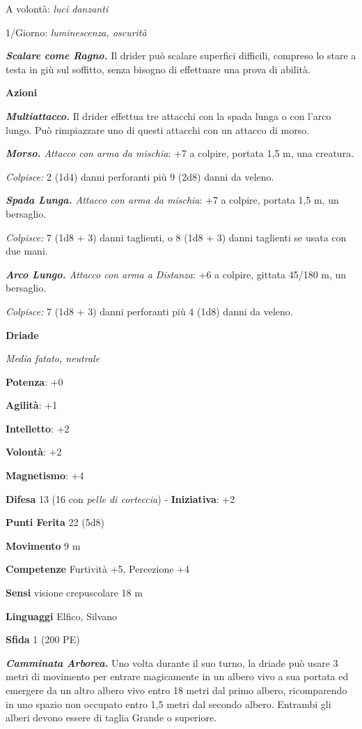 \begin{multicols}{2}
A volontà: \emph{luci danzanti}

1/Giorno: \emph{luminescenza, oscurità}

\emph{\textbf{Scalare come Ragno.}} Il drider può scalare superfici
difficili, compreso lo stare a testa in giù sul soffitto, senza bisogno
di effettuare una prova di abilità.

\textbf{Azioni}

\emph{\textbf{Multiattacco.}} Il drider effettua tre attacchi con la
spada lunga o con l'arco lungo. Può rimpiazzare uno di questi attacchi
con un attacco di morso.

\emph{\textbf{Morso.} Attacco con arma da mischia}: +7 a colpire,
portata 1,5 m, una creatura.

\emph{Colpisce:} 2 (1d4) danni perforanti più 9 (2d8) danni da veleno.

\emph{\textbf{Spada Lunga.} Attacco con arma da mischia}: +7 a colpire,
portata 1,5 m, un bersaglio.

\emph{Colpisce:} 7 (1d8 + 3) danni taglienti, o 8 (1d8 + 3) danni
taglienti se usata con due mani.

\emph{\textbf{Arco Lungo.} Attacco con arma a Distanza}: +6 a colpire,
gittata 45/180 m, un bersaglio.

\emph{Colpisce:} 7 (1d8 + 3) danni perforanti più 4 (1d8) danni da
veleno.

\textbf{Driade}

\emph{Media fatato, neutrale}

\textbf{Potenza}: +0

\textbf{Agilità}: +1

\textbf{Intelletto}: +2

\textbf{Volontà}: +2

\textbf{Magnetismo}: +4

\textbf{Difesa} 13 (16 con \emph{pelle di corteccia}) - \textbf{Iniziativa}: +2

\textbf{Punti Ferita} 22 (5d8)

\textbf{Movimento} 9 m

\textbf{Competenze} Furtività +5, Percezione +4

\textbf{Sensi} visione crepuscolare 18 m

\textbf{Linguaggi} Elfico, Silvano

\textbf{Sfida} 1 (200 PE)

\emph{\textbf{Camminata Arborea.}} Uno volta durante il suo turno, la
driade può usare 3 metri di movimento per entrare magicamente in un
albero vivo a sua portata ed emergere da un altro albero vivo entro 18
metri dal primo albero, ricomparendo in uno spazio non occupato entro
1,5 metri dal secondo albero. Entrambi gli alberi devono essere di
taglia Grande o superiore.


\end{multicols}
